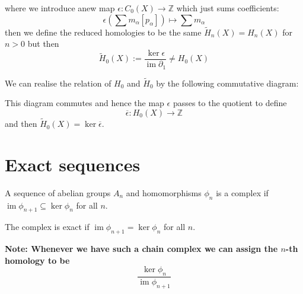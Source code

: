 \documentclass[11pt]{article}
\newcommand{\defeq}{:=}
\DeclareMathOperator{\im}{\mathrm{im}}
\newcommand{\Z}{\mathbb{Z}}
\newcommand{\mdf}[1]{{\color{red} #1}}
\newenvironment{note}
	{\begin{mdframed}[backgroundcolor=white, linecolor=red, roundcorner=5pt, linewidth=1pt]\bfseries{Note:}\normalfont}
	{\end{mdframed}}
\begin{document}
\begin{figure}[ht]
	\centering
\end{figure}
where we introduce  anew map $\epsilon:C_0(X)\to\Z$ which just sums coefficients:
\[
	\epsilon\left(\sum m_\alpha [p_\alpha]\right)\mapsto \sum m_\alpha
\]
then we define the \mdf{reduced homologies} to be the same $\widetilde{H}_n(X)=H_n(X)$ for $n>0$ but then
\[
	\widetilde{H}_0(X)\defeq\frac{\ker\epsilon}{\im\partial_1}\neq H_0(X)
\]

We can realise the relation of $H_0$ and $\widetilde{H}_0$ by the following commutative diagram:

\begin{figure}[ht]
	\centering
\end{figure}

This diagram commutes and hence the map $\epsilon$ passes to the quotient to define
\[
	\overline{\epsilon}:H_0(X)\to\Z
\]
and then $\widetilde{H}_0(X)=\ker\overline{\epsilon}$.

\section{Exact sequences}
A sequence of abelian groups $A_n$ and homomorphisms $\phi_n$ is a \mdf{complex} if $\im\phi_{n+1}\subseteq\ker\phi_n$ for all $n$.
\begin{figure}[H]
	\centering
\end{figure}

The complex is \mdf{exact} if $\im\phi_{n+1}=\ker\phi_n$ for all $n$.

\begin{note}
	Whenever we have such a chain complex we can assign the $n$-th homology to be
	\[
		\frac{\ker \phi_n}{\im \phi_{n+1}}
	\]
\end{note}
\end{document}
